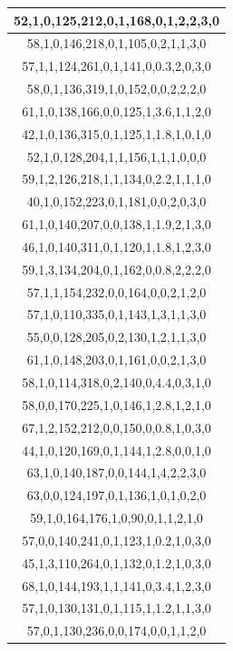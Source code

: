 \documentclass{article}
\begin{document}
\begin{table}[h!]
\begin{tabular}{|c|}
52,1,0,125,212,0,1,168,0,1,2,2,3,0 \\ \hline
58,1,0,146,218,0,1,105,0,2,1,1,3,0 \\ \hline
57,1,1,124,261,0,1,141,0,0.3,2,0,3,0 \\ \hline
58,0,1,136,319,1,0,152,0,0,2,2,2,0 \\ \hline
61,1,0,138,166,0,0,125,1,3.6,1,1,2,0 \\ \hline
42,1,0,136,315,0,1,125,1,1.8,1,0,1,0 \\ \hline
52,1,0,128,204,1,1,156,1,1,1,0,0,0 \\ \hline
59,1,2,126,218,1,1,134,0,2.2,1,1,1,0 \\ \hline
40,1,0,152,223,0,1,181,0,0,2,0,3,0 \\ \hline
61,1,0,140,207,0,0,138,1,1.9,2,1,3,0 \\ \hline
46,1,0,140,311,0,1,120,1,1.8,1,2,3,0 \\ \hline
59,1,3,134,204,0,1,162,0,0.8,2,2,2,0 \\ \hline
57,1,1,154,232,0,0,164,0,0,2,1,2,0 \\ \hline
57,1,0,110,335,0,1,143,1,3,1,1,3,0 \\ \hline
55,0,0,128,205,0,2,130,1,2,1,1,3,0 \\ \hline
61,1,0,148,203,0,1,161,0,0,2,1,3,0 \\ \hline
58,1,0,114,318,0,2,140,0,4.4,0,3,1,0 \\ \hline
58,0,0,170,225,1,0,146,1,2.8,1,2,1,0 \\ \hline
67,1,2,152,212,0,0,150,0,0.8,1,0,3,0 \\ \hline
44,1,0,120,169,0,1,144,1,2.8,0,0,1,0 \\ \hline
63,1,0,140,187,0,0,144,1,4,2,2,3,0 \\ \hline
63,0,0,124,197,0,1,136,1,0,1,0,2,0 \\ \hline
59,1,0,164,176,1,0,90,0,1,1,2,1,0 \\ \hline
57,0,0,140,241,0,1,123,1,0.2,1,0,3,0 \\ \hline
45,1,3,110,264,0,1,132,0,1.2,1,0,3,0 \\ \hline
68,1,0,144,193,1,1,141,0,3.4,1,2,3,0 \\ \hline
57,1,0,130,131,0,1,115,1,1.2,1,1,3,0 \\ \hline
57,0,1,130,236,0,0,174,0,0,1,1,2,0 \\ \hline
\end{tabular}
\end{table}
\end{document}
